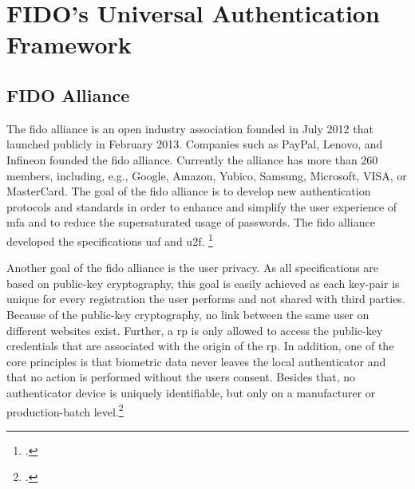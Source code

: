 \section{FIDO's Universal Authentication Framework}
\subsection{FIDO Alliance}
\label{subsec:fido_alliance}

The \gls{fido} alliance is an open industry association founded in July 2012 that launched publicly in February 2013. Companies such as PayPal, Lenovo, and Infineon founded the \gls{fido} alliance. Currently the alliance has more than 260 members, including, e.g., Google, Amazon, Yubico, Samsung, Microsoft, VISA, or MasterCard. The goal of the \gls{fido} alliance is to develop new authentication protocols and standards in order to enhance and simplify the user experience of \gls{mfa} and to reduce the supersaturated usage of passwords. The \gls{fido} alliance developed the specifications \gls{uaf} and \gls{u2f}. \footcites[See][583]{eckert-it-sec-9}[See][17]{fido-ct-2}

Another goal of the \gls{fido} alliance is the user privacy. As all specifications are based on public-key cryptography, this goal is easily achieved as each key-pair is unique for every registration the user performs and not shared with third parties. Because of the public-key cryptography, no link between the same user on different websites exist. Further, a \gls{rp} is only allowed to access the public-key credentials that are associated with the origin of the \gls{rp}. In addition, one of the core principles is that biometric data never leaves the local authenticator and that no action is performed without the users consent. Besides that, no authenticator device is uniquely identifiable, but only on a manufacturer or production-batch level.\footcite[See][6--7]{fido-privacy}


